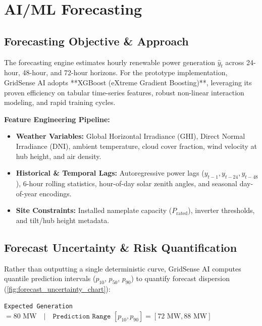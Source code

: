\section{AI/ML Forecasting}
\label{sec:ai_ml_forecasting}

\subsection{Forecasting Objective \& Approach}
\label{subsec:forecasting_objective}

The forecasting engine estimates hourly renewable power generation $\hat{y}_t$ across 24-hour, 48-hour, and 72-hour horizons. For the prototype implementation, GridSense AI adopts **XGBoost (eXtreme Gradient Boosting)**, leveraging its proven efficiency on tabular time-series features, robust non-linear interaction modeling, and rapid training cycles.

\textbf{Feature Engineering Pipeline:}
\begin{itemize}[leftmargin=1.5em, itemsep=0.2em]
    \item \textbf{Weather Variables:} Global Horizontal Irradiance (GHI), Direct Normal Irradiance (DNI), ambient temperature, cloud cover fraction, wind velocity at hub height, and air density.
    \item \textbf{Historical \& Temporal Lags:} Autoregressive power lags ($y_{t-1}, y_{t-24}, y_{t-48}$), 6-hour rolling statistics, hour-of-day solar zenith angles, and seasonal day-of-year encodings.
    \item \textbf{Site Constraints:} Installed nameplate capacity ($P_{\text{rated}}$), inverter thresholds, and tilt/hub height metadata.
\end{itemize}

\subsection{Forecast Uncertainty \& Risk Quantification}
\label{subsec:uncertainty_risk}

Rather than outputting a single deterministic curve, GridSense AI computes quantile prediction intervals ($p_{10}$, $p_{50}$, $p_{90}$) to quantify forecast dispersion (\cref{fig:forecast_uncertainty_chart}):
\begin{center}
    \texttt{Expected Generation } $= 80\text{ MW} \quad \big\vert \quad \texttt{Prediction Range } [p_{10}, p_{90}] = [72\text{ MW}, 88\text{ MW}]$
\end{center}

